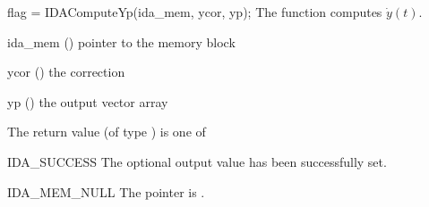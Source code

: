 {
  flag = IDAComputeYp(ida\_mem, ycor, yp);
}
{
  The function computes $\dot{y}(t)$.
}
{
  \begin{args}
    \item[ida\_mem] () pointer to the {\ida} memory block
    \item[ycor] () the correction
    \item[yp] () the output vector array
  \end{args}
}
{
  The return value  (of type ) is one of
  \begin{args}
  \item[IDA\_SUCCESS]
    The optional output value has been successfully set.
  \item[IDA\_MEM\_NULL]
    The  pointer is .
  \end{args}
}
{}




